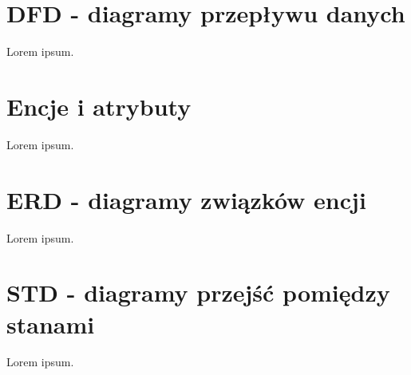 \section{DFD - diagramy przepływu danych}
\label{sec:DFD}

Lorem ipsum.


\section{Encje i atrybuty}
\label{sec:encje}

Lorem ipsum.


\section{ERD - diagramy związków encji}
\label{sec:ERD}

Lorem ipsum.


\section{STD - diagramy przejść pomiędzy stanami}
\label{sec:STD}

Lorem ipsum.